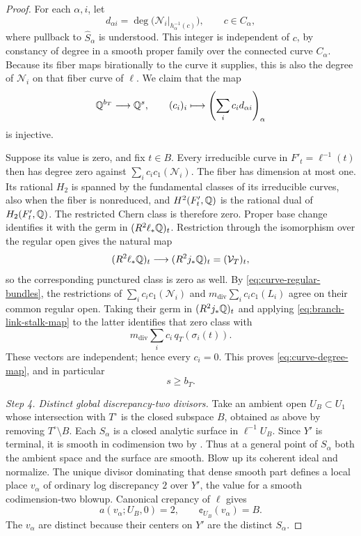 \begin{proof}
For each \(\alpha,i\), let
\[
 d_{\alpha i}
 =\deg\bigl(\mathcal N_i|_{h_\alpha^{-1}(c)}\bigr),
 \qquad c\in C_\alpha,
\]
where pullback to \(\widehat S_\alpha\) is understood.  This integer
is independent of \(c\), by constancy of degree in a smooth proper
family over the connected curve \(C_\alpha\).  Because its fiber
maps birationally to the curve it supplies, this is also the degree
of \(\mathcal N_i\) on that fiber curve of \(\ell\).
We claim that the map
\begin{equation}\label{eq:curve-degree-map}
 \mathbb{Q}^{b_T}\longrightarrow\mathbb{Q}^s,\qquad
 (c_i)_i\longmapsto
 \left(\sum_i c_i d_{\alpha i}\right)_\alpha
\end{equation}
is injective.

Suppose its value is zero, and fix \(t\in B\).  Every irreducible
curve in \(F'_t=\ell^{-1}(t)\) then has degree zero against
\(\sum_i c_i c_1(\mathcal N_i)\).  The fiber has dimension at most
one.  Its rational \(H_2\) is spanned by the fundamental classes of
its irreducible curves, also when the fiber is nonreduced, and
\(H^2(F'_t,\mathbb{Q})\) is the rational dual of \(H_2(F'_t,\mathbb{Q})\).
The restricted Chern class is therefore zero.  Proper base change
identifies it with the germ in \((R^2\ell_*\mathbb{Q})_t\).
Restriction through the isomorphism over the regular open gives
the natural map
\[
 (R^2\ell_*\mathbb{Q})_t\longrightarrow (R^2j_*\mathbb{Q})_t
     =(\mathcal V_T)_t,
\]
so the corresponding punctured class is zero as well.  By
\eqref{eq:curve-regular-bundles}, the restrictions of
\(\sum_i c_i c_1(\mathcal N_i)\) and
\(m_{\mathrm{div}}\sum_i c_i c_1(L_i)\) agree on their common regular
open.  Taking their germ in \((R^2j_*\mathbb{Q})_t\) and applying
\eqref{eq:branch-link-stalk-map} to the latter identifies that zero
class with
\[
 m_{\mathrm{div}}\sum_i c_i\,q_T(\sigma_i(t)).
\]
These vectors are independent; hence every \(c_i=0\).  This proves
\eqref{eq:curve-degree-map}, and in particular
\begin{equation}\label{eq:curve-surface-count}
 s\ge b_T.
\end{equation}

\emph{Step 4. Distinct global discrepancy-two divisors.}
Take an ambient open \(U_B\subset U_1\) whose intersection with
\(T^\circ\) is the closed subspace \(B\), obtained as above by
removing \(T^\circ\setminus B\).  Each \(S_\alpha\) is a closed
analytic surface in \(\ell^{-1}U_B\).  Since \(Y'\) is terminal,
it is smooth in codimension two by
\cite[Lemma~2.3]{CanonicalKahler}.  Thus at a general point of
\(S_\alpha\) both the ambient space and the surface are smooth.
Blow up its coherent ideal and normalize.  The unique divisor
dominating that dense smooth part defines a local place \(v_\alpha\)
of ordinary log discrepancy \(2\) over \(Y'\), the value for a
smooth codimension-two blowup.  Canonical crepancy of \(\ell\)
gives
\[
 a(v_\alpha;U_B,0)=2,\qquad
 \cent_{U_B}(v_\alpha)=B.
\]
The \(v_\alpha\) are distinct because their centers on \(Y'\) are
the distinct \(S_\alpha\).


\end{proof}

